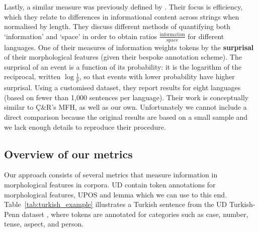 \documentclass[USenglish]{article}
\begin{document}
Lastly, a similar measure was previously defined by \citet{sproat_database_2014}.
Their focus is efficiency, which they relate to differences in informational content across strings when normalised by length.
They discuss different methods of quantifying both `information' and `space' in order to obtain ratios $\frac{\text{information}}{\text{space}}$ for different languages.
One of their measures of information weights tokens by the \textbf{surprisal} of their morphological features (given their bespoke annotation scheme).
The surprisal of an event is a function of its probability: it is the logarithm of the reciprocal, written $\log{\frac{1}{p}}$, so that events with lower probability have higher surprisal.
Using a customised dataset, they report results for eight languages (based on fewer than 1,000 sentences per language).
Their work is conceptually similar to Ç\&R's MFH, as well as our own. 
Unfortunately we cannot include a direct comparison because the original results are based on a small sample and we lack enough details to reproduce their procedure.

\subsection{Overview of our metrics}
\label{ours_overview}
Our approach consists of several metrics that measure information in morphological features in corpora.
UD \citep{UD_2.14} contain token annotations for morphological features, UPOS and lemma which we can use to this end.
Table~\ref{tab:turkish_example} illustrates a Turkish sentence from the UD Turkish-Penn dataset \citep{kuzgun_2020_UD_turkish_penn}, where tokens are annotated for categories such as case, number, tense, aspect, and person.
\end{document}
